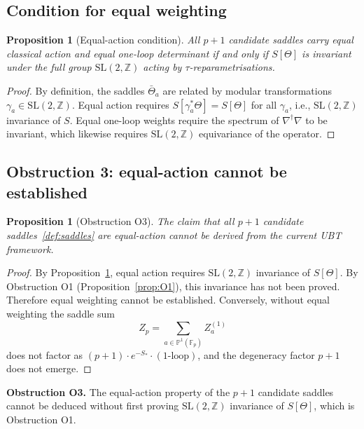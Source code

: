 \documentclass[12pt,a4paper]{article}
\newtheorem{proposition}[theorem]{Proposition}
\theoremstyle{definition}
\theoremstyle{remark}
\newcommand{\SL}{\mathrm{SL}}
\newcommand{\ZZ}{\mathbb{Z}}
\newcommand{\FF}{\mathbb{F}}
\newcommand{\PP}{\mathbb{P}}
\newcommand{\Zp}{Z_p}
\begin{document}
\subsection{Condition for equal weighting}

\begin{proposition}[Equal-action condition]
\label{prop:equal}
All $p+1$ candidate saddles carry equal classical action and equal one-loop
determinant if and only if $S[\Theta]$ is invariant under the full group
$\SL(2,\ZZ)$ acting by $\tau$-reparametrisations.
\end{proposition}

\begin{proof}
By definition, the saddles $\bar\Theta_a$ are related by modular
transformations $\gamma_a\in\SL(2,\ZZ)$.  Equal action requires
$S[\gamma_a^*\Theta]=S[\Theta]$ for all $\gamma_a$, i.e., $\SL(2,\ZZ)$
invariance of $S$.  Equal one-loop weights require the spectrum of
$\nabla^\dagger\nabla$ to be invariant, which likewise requires $\SL(2,\ZZ)$
equivariance of the operator.
\end{proof}

\subsection{Obstruction 3: equal-action cannot be established}

\begin{proposition}[Obstruction O3]
\label{prop:O3}
The claim that all $p+1$ candidate saddles~\eqref{def:saddles} are
equal-action cannot be derived from the current UBT framework.
\end{proposition}

\begin{proof}
By Proposition~\ref{prop:equal}, equal action requires $\SL(2,\ZZ)$
invariance of $S[\Theta]$.  By Obstruction O1
(Proposition~\ref{prop:O1}), this invariance has not been proved.
Therefore equal weighting cannot be established.  Conversely, without
equal weighting the saddle sum
\[
  \Zp = \sum_{a\in\PP^1(\FF_p)} Z_a^{(1)}
\]
does not factor as $(p+1)\cdot e^{-S_*}\cdot(\text{1-loop})$, and the
degeneracy factor $p+1$ does not emerge.
\end{proof}

\begin{gapbox}
\textbf{Obstruction O3.} The equal-action property of the $p+1$ candidate
saddles cannot be deduced without first proving $\SL(2,\ZZ)$ invariance
of $S[\Theta]$, which is Obstruction O1.
\end{gapbox}
\end{document}
